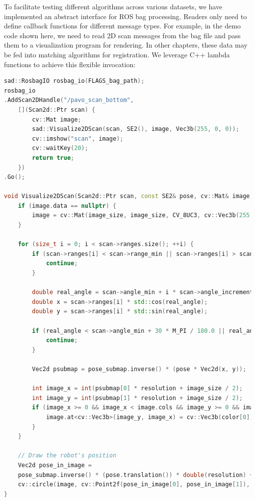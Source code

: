 To facilitate testing different algorithms across various datasets, we have implemented an abstract interface for ROS bag processing. Readers only need to define callback functions for different message types. For example, in the demo code shown here, we need to read 2D scan messages from the bag file and pass them to a visualization program for rendering. In other chapters, these data may be fed into matching algorithms for registration. We leverage C++ lambda functions to achieve this flexible invocation:  

\begin{lstlisting}[language=c++,caption=src/ch6/test\_2dlidar\_io.cc]  
sad::RosbagIO rosbag_io(FLAGS_bag_path);  
rosbag_io  
.AddScan2DHandle("/pavo_scan_bottom",  
	[](Scan2d::Ptr scan) {  
		cv::Mat image;  
		sad::Visualize2DScan(scan, SE2(), image, Vec3b(255, 0, 0));  
		cv::imshow("scan", image);  
		cv::waitKey(20);  
		return true;  
	})  
.Go();  

void Visualize2DScan(Scan2d::Ptr scan, const SE2& pose, cv::Mat& image, const Vec3b& color, int image_size, float resolution, const SE2& pose_submap) {  
	if (image.data == nullptr) {  
		image = cv::Mat(image_size, image_size, CV_8UC3, cv::Vec3b(255, 255, 255));  
	}  
	
	for (size_t i = 0; i < scan->ranges.size(); ++i) {  
		if (scan->ranges[i] < scan->range_min || scan->ranges[i] > scan->range_max) {  
			continue;  
		}  
		
		double real_angle = scan->angle_min + i * scan->angle_increment;  
		double x = scan->ranges[i] * std::cos(real_angle);  
		double y = scan->ranges[i] * std::sin(real_angle);  
		
		if (real_angle < scan->angle_min + 30 * M_PI / 180.0 || real_angle > scan->angle_max - 30 * M_PI / 180.0) {  
			continue;  
		}  
		
		Vec2d psubmap = pose_submap.inverse() * (pose * Vec2d(x, y));  
		
		int image_x = int(psubmap[0] * resolution + image_size / 2);  
		int image_y = int(psubmap[1] * resolution + image_size / 2);  
		if (image_x >= 0 && image_x < image.cols && image_y >= 0 && image_y < image.rows) {  
			image.at<cv::Vec3b>(image_y, image_x) = cv::Vec3b(color[0], color[1], color[2]);  
		}  
	}  
	
	// Draw the robot's position  
	Vec2d pose_in_image =  
	pose_submap.inverse() * (pose.translation()) * double(resolution) + Vec2d(image_size / 2, image_size / 2);  
	cv::circle(image, cv::Point2f(pose_in_image[0], pose_in_image[1]), 5, cv::Scalar(color[0], color[1], color[2]), 2);  
}  
\end{lstlisting}  

